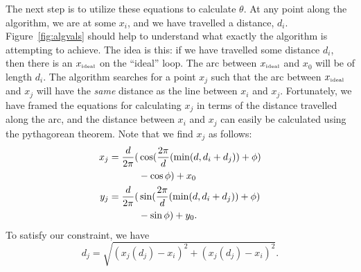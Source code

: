 \documentclass[twocolumn,11pt]{article}
\begin{document}
The next step is to utilize these equations to calculate $\theta$. At any point
along the algorithm, we are at some $x_i$, and we have travelled a distance,
$d_i$. Figure~\ref{fig:algvals} should help to understand what exactly the
algorithm is attempting to achieve. The idea is this: if we have travelled some
distance $d_i$, then there is an $x_{\mbox{{\tiny ideal}}}$ on the ``ideal''
loop. The arc between $x_{\mbox{{\tiny ideal}}}$ and $x_0$ will be of length
$d_i$. The algorithm searches for a point $x_j$ such that the arc between
$x_{\mbox{{\tiny ideal}}}$ and $x_j$ will have the \emph{same} distance as the
line between $x_i$ and $x_j$. Fortunately, we have framed the equations for
calculating $x_j$ in terms of the distance travelled along the arc, and the
distance between $x_i$ and $x_j$ can easily be calculated using the pythagorean
theorem. Note that we find $x_j$ as follows:
\begin{align}
  x_j = \frac{d}{2\pi} ( & \cos( \frac{ 2 \pi }{ d } ( \min( d, d_i + d_j ) )
                                  + \phi ) \notag \\ & - \cos \phi ) + x_0
                                  \label{eq:xj} \\
  y_j = \frac{d}{2\pi} ( & \sin( \frac{ 2 \pi }{ d } ( \min( d, d_i + d_j ) )
                                  + \phi ) \notag \\ & - \sin \phi ) + y_0.
                                  \label{eq:yj}
\end{align}
To satisfy our constraint, we have
\[ d_j = \sqrt{ ( x_j(d_j) - x_i )^2 + ( x_j(d_j) - x_i )^2 }. \]
\end{document}
